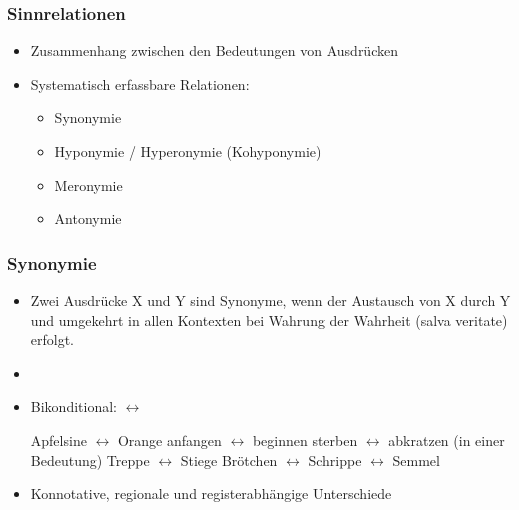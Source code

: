 \begin{frame}
\frametitle{Sinnrelationen}

\begin{itemize}
	\item Zusammenhang zwischen den Bedeutungen von Ausdrücken
	\item Systematisch erfassbare Relationen:
	
\vspace{5mm}
	
	\begin{itemize}
		\item Synonymie
		\item Hyponymie / Hyperonymie (Kohyponymie)
		\item Meronymie
 		\item Antonymie
	\end{itemize}
	
\end{itemize}

\end{frame}



\begin{frame}
\frametitle{Synonymie}

\begin{itemize}
	\item Zwei Ausdrücke X und Y sind Synonyme, wenn der Austausch von X durch Y und umgekehrt in allen Kontexten bei Wahrung der Wahrheit (salva veritate) erfolgt.
	\item[]
	\item Bikonditional: $\leftrightarrow$
	
	\eal
		\ex Apfelsine $\leftrightarrow$ Orange
		\ex anfangen $\leftrightarrow$ beginnen
		\ex sterben $\leftrightarrow$ abkratzen (in einer Bedeutung)
		\ex Treppe $\leftrightarrow$ Stiege
		\ex Brötchen $\leftrightarrow$ Schrippe $\leftrightarrow$ Semmel
	\zl
	
	\item Konnotative, regionale und registerabhängige Unterschiede
\end{itemize}

\end{frame}




